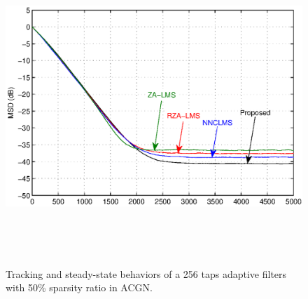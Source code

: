 \begin{figure}[!htb]
\begin{center}
\vspace{1cm}
\includegraphics[width=15cm, height=11.2cm]{Figures/Chapter5/fig12.eps}\\
\end{center}
\vspace{-1cm}
\caption{Tracking and steady-state behaviors of a 256 taps adaptive filters with 50\% sparsity ratio in ACGN.}
\label{fig12}
\vspace{1.5cm}
\end{figure}


